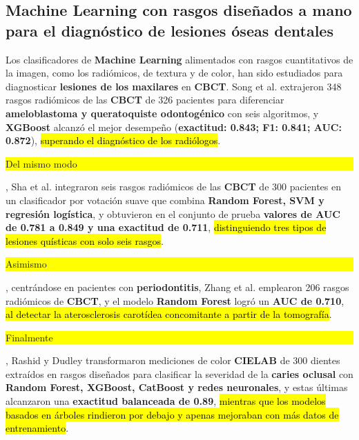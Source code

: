 \documentclass[runningheads]{llncs}
\newcommand{\prob}[1]{\textcolor{problema}{\textbf{#1}}}
\newcommand{\sol}[1]{\textcolor{solucion}{\textbf{#1}}}
\newcommand{\dat}[1]{\textcolor{dataset}{\textbf{#1}}}
\newcommand{\con}[1]{{\setlength{\fboxsep}{0.5pt}\colorbox{yellow}{\strut #1}}}
\newcommand{\res}[1]{\textcolor{resultado}{\textbf{#1}}}
\newcommand{\hal}[1]{{\sethlcolor{hallazgo}\hl{#1}}}
\newcommand{\prob}[1]{#1}
\newcommand{\sol}[1]{#1}
\newcommand{\dat}[1]{#1}
\newcommand{\con}[1]{#1}
\newcommand{\res}[1]{#1}
\newcommand{\hal}[1]{#1}
\begin{document}
\subsection{\sol{Machine Learning} con rasgos diseñados a mano para el
diagnóstico de \prob{lesiones óseas dentales}}
Los clasificadores de \sol{Machine Learning} alimentados con rasgos
cuantitativos de la imagen, como los radiómicos, de textura y de color, han
sido estudiados para diagnosticar \prob{lesiones de los
maxilares} en \dat{CBCT}. Song et al. \cite{song2024radiomics} extrajeron
348 rasgos radiómicos de las \dat{CBCT} de 326 pacientes para diferenciar
\prob{ameloblastoma y queratoquiste odontogénico} con seis algoritmos, y
\sol{XGBoost} alcanzó el mejor desempeño (\res{exactitud: 0.843; F1:
0.841; AUC: 0.872}), \hal{superando el diagnóstico de los radiólogos}.
\con{Del mismo modo}, Sha et al. \cite{sha2025radiomics} integraron seis
rasgos radiómicos de las \dat{CBCT} de 300 pacientes en un clasificador
por votación suave que combina \sol{Random Forest, SVM y regresión
logística}, y obtuvieron en el conjunto de prueba \res{valores de AUC de
0.781 a 0.849 y una exactitud de 0.711}, \hal{distinguiendo tres tipos de
lesiones quísticas con solo seis rasgos}. \con{Asimismo}, centrándose en
pacientes con \prob{periodontitis}, Zhang et al. \cite{zhang2026radiomic}
emplearon 206 rasgos radiómicos de \dat{CBCT}, y el modelo \sol{Random
Forest} logró un \res{AUC de 0.710}, \hal{al detectar la aterosclerosis
carotídea concomitante a partir de la tomografía}. \con{Finalmente},
Rashid y Dudley \cite{rashid2026cielab} transformaron mediciones de color
\dat{CIELAB} de 300 dientes extraídos en rasgos diseñados para clasificar
la severidad de la \prob{caries oclusal} con \sol{Random Forest, XGBoost,
CatBoost y redes neuronales}, y estas últimas alcanzaron una \res{exactitud
balanceada de 0.89}, \hal{mientras que los modelos basados en árboles
rindieron por debajo y apenas mejoraban con más
datos de entrenamiento}.
\end{document}
